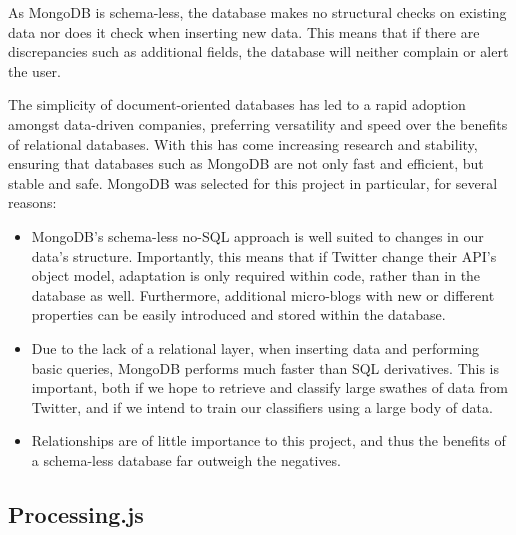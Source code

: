 As MongoDB is schema-less, the database makes no structural checks on existing data nor does it check when inserting new data. This means that if there are discrepancies such as additional fields, the database will neither complain or alert the user. 

The simplicity of document-oriented databases has led to a rapid adoption amongst data-driven companies\cite{popescu, moore}, preferring versatility and speed over the benefits of relational databases. With this has come increasing research and stability, ensuring that databases such as MongoDB are not only fast and efficient, but stable and safe. MongoDB was selected for this project in particular, for several reasons:

\begin{itemize}
	\item MongoDB's schema-less no-SQL approach is well suited to changes in our data's structure. Importantly, this means that if Twitter change their API's object model, adaptation is only required within code, rather than in the database as well. Furthermore, additional micro-blogs with new or different properties can be easily introduced and stored within the database.
	\item Due to the lack of a relational layer, when inserting data and performing basic queries, MongoDB performs much faster than SQL derivatives\cite{kennedy}. This is important, both if we hope to retrieve and classify large swathes of data from Twitter, and if we intend to train our classifiers using a large body of data.
	\item Relationships are of little importance to this project, and thus the benefits of a schema-less database far outweigh the negatives.
\end{itemize}

\subsection{Processing.js}

